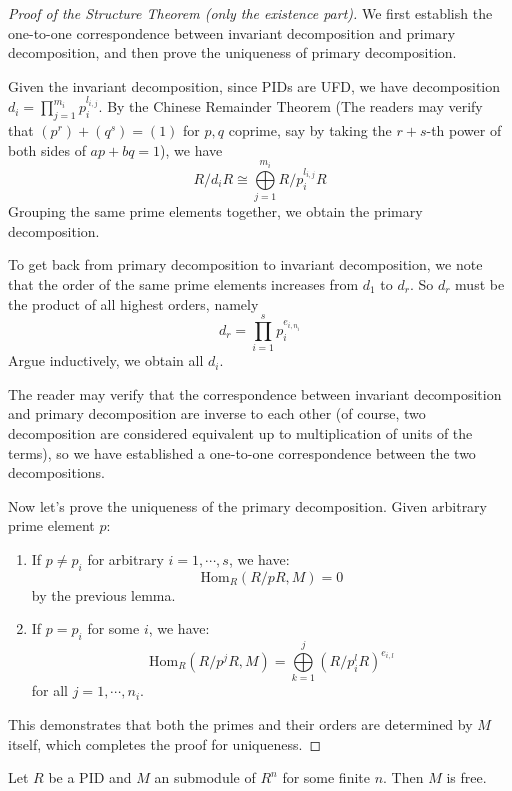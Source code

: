 \documentclass{note-eng}
\begin{document}
\begin{proof}[Proof of the Structure Theorem (only the existence part)]
    We first establish the one-to-one correspondence between invariant decomposition and primary decomposition, and then prove the uniqueness of primary decomposition.

    Given the invariant decomposition, since PIDs are UFD, we have decomposition $d_i = \prod\limits_{j = 1}^{m_i} p_i^{l_{i, j}}$. By the Chinese Remainder Theorem (The readers may verify that $(p^r) + (q^s) = (1)$ for $p, q$ coprime, say by taking the $r + s$-th power of both sides of $ap + bq = 1$), we have 
    $$R / d_i R \cong \bigoplus\limits_{j = 1}^{m_i} R / p_i^{l_{i, j}} R$$
    Grouping the same prime elements together, we obtain the primary decomposition.

    To get back from primary decomposition to invariant decomposition, we note that the order of the same prime elements increases from $d_1$ to $d_r$. So $d_r$ must be the product of all highest orders, namely
    $$d_r = \prod\limits_{i = 1}^{s} p_i^{e_{i, n_i}}$$
    Argue inductively, we obtain all $d_i$.

    The reader may verify that the correspondence between invariant decomposition and primary decomposition are inverse to each other (of course, two decomposition are considered equivalent up to multiplication of units of the terms), so we have established a one-to-one correspondence between the two decompositions.

    Now let's prove the uniqueness of the primary decomposition. Given arbitrary prime element $p$:
    \begin{enumerate}
        \item If $p \ne p_i$ for arbitrary $i = 1, \cdots, s$, we have:
        $$\mathrm{Hom}_{R}(R / pR, M) = 0$$
        by the previous lemma.
        \item If $p = p_i$ for some $i$, we have:
        $$\mathrm{Hom}_{R}(R / p^jR, M) = \bigoplus\limits_{k = 1}^{j} (R / p_i^{l} R)^{e_{i, l}}$$
        for all $j = 1, \cdots, n_i$.
    \end{enumerate}
    This demonstrates that both the primes and their orders are determined by $M$ itself, which completes the proof for uniqueness.
\end{proof}

\begin{corollary}
    Let $R$ be a PID and $M$ an submodule of $R^n$ for some finite $n$. Then $M$ is free.
\end{corollary}
\end{document}
